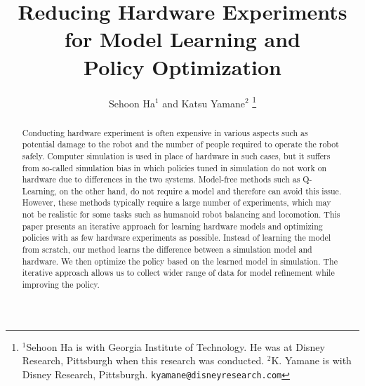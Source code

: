 \documentclass[letterpaper, 10 pt, conference]{ieeeconf}
\title{\bf Reducing Hardware Experiments for Model Learning and \\Policy
Optimization}
\author{Sehoon Ha$^1$ and Katsu Yamane$^2$%
\thanks{$^1$Sehoon Ha is with Georgia Institute of Technology.  He was
at Disney Research, Pittsburgh when this research was conducted.
$^2$K. Yamane is with Disney Research, Pittsburgh.
{\tt\small kyamane@disneyresearch.com}}%
}
\begin{document}


% 


\maketitle
\thispagestyle{empty}
\pagestyle{empty}

\begin{abstract}
Conducting hardware experiment is often expensive in various aspects
 such as potential damage to the robot and the number of people required
 to operate the robot safely.
Computer simulation is used in place of hardware in such cases, but it
 suffers from so-called simulation bias in which policies tuned in
 simulation do not work on hardware due to differences in the two systems.
Model-free methods such as Q-Learning, on the other hand, do
 not require a model and therefore can avoid this issue.
However, these methods typically require a large number of experiments,
 which may not be realistic for some tasks such as humanoid
 robot balancing and locomotion.
This paper presents an iterative approach for learning hardware models
 and optimizing policies with as few hardware experiments as
 possible. 
Instead of learning the model from scratch, our method learns the
 difference between a simulation model and hardware.
We then optimize the policy based on the learned model in
 simulation. 
The iterative approach allows us to collect wider range of data for
 model refinement while improving the policy.
\end{abstract}
\end{document}
